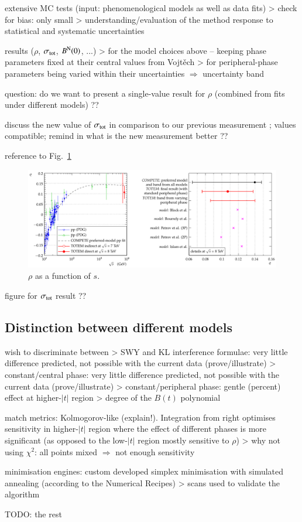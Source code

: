 \> extensive MC tests (input: phenomenological models as well as data fits)
\>> check for bias: only small
\>> understanding/evaluation of the method response to statistical and systematic uncertainties

\> results ($\rho$, $\sigma_{\rm tot}$, $B^{\rm N}(0)$, ...)
\>> for the model choices above -- keeping phase parameters fixed at their central values from Vojt\v ech
\>> for peripheral-phase parameters being varied within their uncertainties $\Rightarrow$ uncertainty band

\> question: do we want to present a single-value result for $\rho$ (combined from fits under different models) ??

\> discuss the new value of $\sigma_{\rm tot}$ in comparison to our previous measurement \cite{prl111}; values compatible; remind in what is the new measurement better ??

\> reference to Fig.~\ref{fig:rho_s}

\begin{figure}
\begin{center}
\includegraphics[width=16cm]{fig/rho_s.pdf}
\vskip-3mm
\caption{$\rho$ as a function of $s$.}
\label{fig:rho_s}
\end{center}
\end{figure}

\> figure for $\sigma_{\rm tot}$ result ?? 

\subsection{Distinction between different models}
\label{sec:cni dist mod}

\> wish to discriminate between
\>> SWY and KL interference formulae: very little difference predicted, not possible with the current data (prove/illustrate)
\>> constant/central phase: very little difference predicted, not possible with the current data (prove/illustrate)
\>> constant/peripheral phase: gentle (percent) effect at higher-$|t|$ region
\>> degree of the $B(t)$ polynomial

\> match metrics: Kolmogorov-like (explain!). Integration from right optimises sensitivity in higher-$|t|$ region where the effect of different phases is more significant (as opposed to the low-$|t|$ region mostly sensitive to $\rho$)
\>> why not using $\chi^2$: all points mixed $\Rightarrow$ not enough sensitivity

\> minimisation engines: custom developed simplex minimisation with simulated annealing (according to the Numerical Recipes)
\>> scans used to validate the algorithm

TODO: the rest

